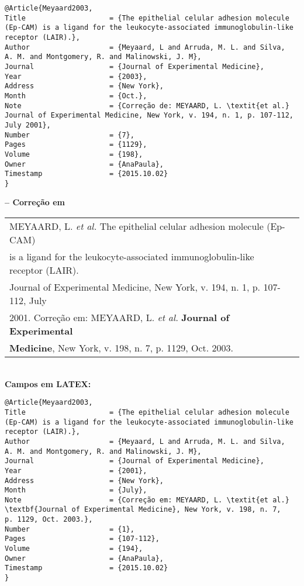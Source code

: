 \begin{verbatim}
@Article{Meyaard2003,
Title                    = {The epithelial celular adhesion molecule 
(Ep-CAM) is a ligand for the leukocyte-associated immunoglobulin-like 
receptor (LAIR).}, 
Author                   = {Meyaard, L and Arruda, M. L. and Silva, 
A. M. and Montgomery, R. and Malinowski, J. M},
Journal                  = {Journal of Experimental Medicine},
Year                     = {2003},
Address                  = {New York},
Month                    = {Oct.},
Note                     = {Correção de: MEYAARD, L. \textit{et al.} 
Journal of Experimental Medicine, New York, v. 194, n. 1, p. 107-112, 
July 2001},
Number                   = {7},
Pages                    = {1129},
Volume                   = {198},
Owner                    = {AnaPaula},
Timestamp                = {2015.10.02}
}
\end{verbatim}

\textbf{-- Correção em} \\

\begin{tabular}{|l|c|} \hline
	MEYAARD, L. \textit{et al.} The epithelial celular adhesion molecule (Ep-CAM)
	\\is a ligand for the leukocyte-associated immunoglobulin-like receptor
	(LAIR). \\Journal of Experimental Medicine, New York, v. 194, n. 1, p. 107-112, July \\2001. Correção em: MEYAARD, L. \textit{et al.} \textbf{Journal of Experimental}\\ \textbf{Medicine}, New York, v. 198, n. 7, p. 1129, Oct. 2003. 
	\\\hline
\end{tabular} \\

\textbf{Campos em LATEX:} 

\begin{verbatim}
@Article{Meyaard2003,
Title                    = {The epithelial celular adhesion molecule 
(Ep-CAM) is a ligand for the leukocyte-associated immunoglobulin-like 
receptor (LAIR).},
Author                   = {Meyaard, L and Arruda, M. L. and Silva, 
A. M. and Montgomery, R. and Malinowski, J. M},
Journal                  = {Journal of Experimental Medicine},
Year                     = {2001},
Address                  = {New York},
Month                    = {July},
Note                     = {Correção em: MEYAARD, L. \textit{et al.} 
\textbf{Journal of Experimental Medicine}, New York, v. 198, n. 7, 
p. 1129, Oct. 2003.},
Number                   = {1},
Pages                    = {107-112},
Volume                   = {194},
Owner                    = {AnaPaula},
Timestamp                = {2015.10.02}
}
\end{verbatim}

